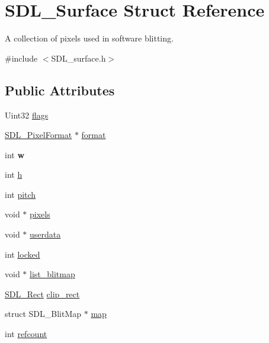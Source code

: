 \hypertarget{struct_s_d_l___surface}{}\section{S\+D\+L\+\_\+\+Surface Struct Reference}
\label{struct_s_d_l___surface}


A collection of pixels used in software blitting.  




{\ttfamily \#include $<$S\+D\+L\+\_\+surface.\+h$>$}

\subsection*{Public Attributes}
\begin{DoxyCompactItemize}
\item 
Uint32 \mbox{\hyperlink{struct_s_d_l___surface_a86d78b665d5dfd7aa1dd9696b067641b}{flags}}
\item 
\mbox{\hyperlink{struct_s_d_l___pixel_format}{S\+D\+L\+\_\+\+Pixel\+Format}} $\ast$ \mbox{\hyperlink{struct_s_d_l___surface_a0a90721f947c10c3b79e02ccb419ca62}{format}}
\item 
\mbox{\label{struct_s_d_l___surface_a9b0ec7185dcdb2a3530a9160a6ea83d9}} 
int {\bfseries w}
\item 
int \mbox{\hyperlink{struct_s_d_l___surface_af33bcf87a1f5e10a99b3c7e8626b38c8}{h}}
\item 
int \mbox{\hyperlink{struct_s_d_l___surface_a5fa37325d77d65b2ed64ffc7cd01bb6c}{pitch}}
\item 
void $\ast$ \mbox{\hyperlink{struct_s_d_l___surface_abd9597e0e084b8ef33fe0397bc26d911}{pixels}}
\item 
void $\ast$ \mbox{\hyperlink{struct_s_d_l___surface_ae66d973dcb9b57cb34815892e1ee1f31}{userdata}}
\item 
int \mbox{\hyperlink{struct_s_d_l___surface_a5022edaeea1c0a055fa5d6dccba41de2}{locked}}
\item 
void $\ast$ \mbox{\hyperlink{struct_s_d_l___surface_a17294cb1ec1ef7f77f75cdad26ac795f}{list\+\_\+blitmap}}
\item 
\mbox{\hyperlink{struct_s_d_l___rect}{S\+D\+L\+\_\+\+Rect}} \mbox{\hyperlink{struct_s_d_l___surface_aa9a0da3b38261dad6cf0cc4e3bb5b0c3}{clip\+\_\+rect}}
\item 
struct S\+D\+L\+\_\+\+Blit\+Map $\ast$ \mbox{\hyperlink{struct_s_d_l___surface_a8c1ecad399b0d4f525b1a53b6ee9393f}{map}}
\item 
int \mbox{\hyperlink{struct_s_d_l___surface_a03d10628a359c0674f5ceffd574f1641}{refcount}}
\end{DoxyCompactItemize}



